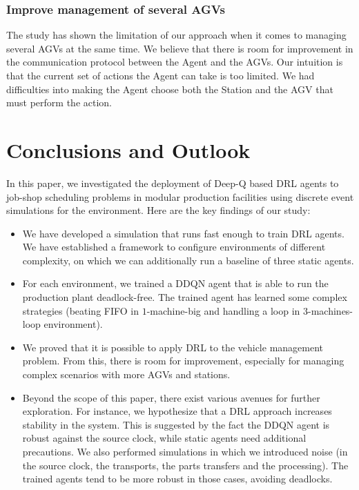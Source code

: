 \documentclass[sn-mathphys]{sn-jnl}
\begin{document}
\subsubsection{Improve management of several AGVs}
\label{sssec:several_agvs}

The study has shown the limitation of our approach when it comes to managing several AGVs at the same time. We believe that there is room for improvement in the communication protocol between the Agent and the AGVs. Our intuition is that the current set of actions the Agent can take is too limited. We had difficulties into making the Agent choose both the Station and the AGV that must perform the action. 

\section{Conclusions and Outlook}
\label{sec:conclusions}
In this paper, we investigated the deployment of Deep-Q based DRL agents to job-shop scheduling problems in modular production facilities using discrete event simulations for the environment. Here are the key findings of our study:
\begin{itemize}
\item We have developed a simulation that runs fast enough to train DRL agents. We have established a framework to configure environments of different complexity, on which we can additionally run a baseline of three static agents.

\item For each environment, we trained a DDQN agent that is able to run the production plant deadlock-free. The trained agent has learned some complex strategies (beating FIFO in $1$-machine-big and handling a loop in $3$-machines-loop environment). 

\item We proved that it is possible to apply DRL to the vehicle management problem. From this, there is room for improvement, especially for managing complex scenarios with more AGVs and stations.


\item Beyond the scope of this paper, there exist various avenues for further exploration. For instance, we hypothesize that a DRL approach increases stability in the system. This is suggested by the fact the DDQN agent is robust against the source clock, while static agents need additional precautions. We also performed simulations in which we introduced noise (in the source clock, the transports, the parts transfers and the processing). The trained agents tend to be more robust in those cases, avoiding deadlocks.
\end{itemize}
\end{document}
